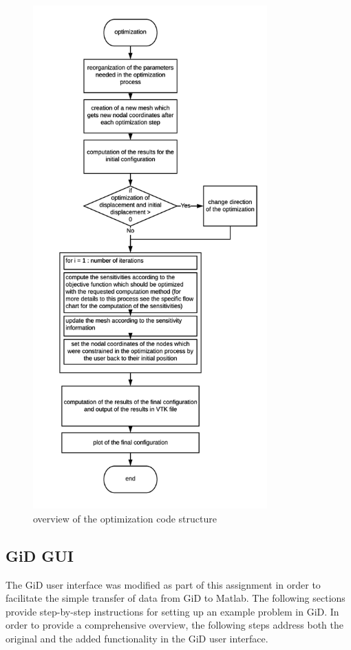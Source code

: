 \begin{figure}[ht]
  \centering
  \includegraphics[width=90mm]{images/optimization.png}
  \caption{overview of the optimization code structure}
  \label{fig:Optimization}
\end{figure}
\clearpage
\subsection{GiD GUI} \label{section:appendix_GiD}
The GiD user interface was modified as part of this assignment in order to facilitate the simple transfer of data from GiD to Matlab. The following sections provide step-by-step instructions for setting up an example problem in GiD. In order to provide a comprehensive overview, the following steps address both the original and the added functionality in the GiD user interface.

